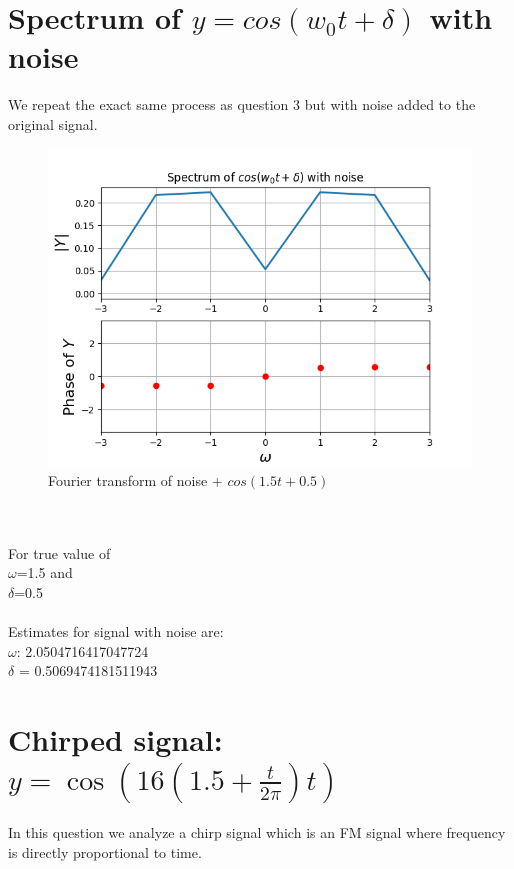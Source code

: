 \documentclass{article}
\begin{document}
\newpage


\section{Spectrum of $y = cos(w_0t + \delta)$ with noise}
We repeat the exact same process as question 3 but with noise added to the original signal.
\begin{figure}[h!]
\centering
\includegraphics[scale=0.6]{Figure_11.png}
\caption{Fourier transform of noise + $cos(1.5t+0.5)$}
\label{fig:universe}
\end{figure}\\\\
For true value of\\
$\omega$=1.5 and\\ 
$\delta$=0.5\\\\
Estimates for signal with noise are:\\
$\omega$: 2.0504716417047724\\
$\delta$ = 0.5069474181511943
\newpage

\section{Chirped signal: $y = \cos\left(16\left(1.5+\frac{t}{2\pi}\right)t\right)$}
In this question we analyze a chirp signal which is an FM signal where frequency is directly proportional to time.
\end{document}
